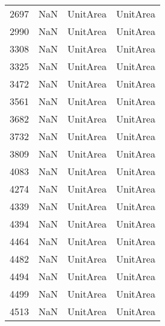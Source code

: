 \begin{tabular}{llll}
2697 &                   NaN &                   UnitArea &                                  UnitArea \\
2990 &                   NaN &                   UnitArea &                                  UnitArea \\
3308 &                   NaN &                   UnitArea &                                  UnitArea \\
3325 &                   NaN &                   UnitArea &                                  UnitArea \\
3472 &                   NaN &                   UnitArea &                                  UnitArea \\
3561 &                   NaN &                   UnitArea &                                  UnitArea \\
3682 &                   NaN &                   UnitArea &                                  UnitArea \\
3732 &                   NaN &                   UnitArea &                                  UnitArea \\
3809 &                   NaN &                   UnitArea &                                  UnitArea \\
4083 &                   NaN &                   UnitArea &                                  UnitArea \\
4274 &                   NaN &                   UnitArea &                                  UnitArea \\
4339 &                   NaN &                   UnitArea &                                  UnitArea \\
4394 &                   NaN &                   UnitArea &                                  UnitArea \\
4464 &                   NaN &                   UnitArea &                                  UnitArea \\
4482 &                   NaN &                   UnitArea &                                  UnitArea \\
4494 &                   NaN &                   UnitArea &                                  UnitArea \\
4499 &                   NaN &                   UnitArea &                                  UnitArea \\
4513 &                   NaN &                   UnitArea &                                  UnitArea \\

\end{tabular}
